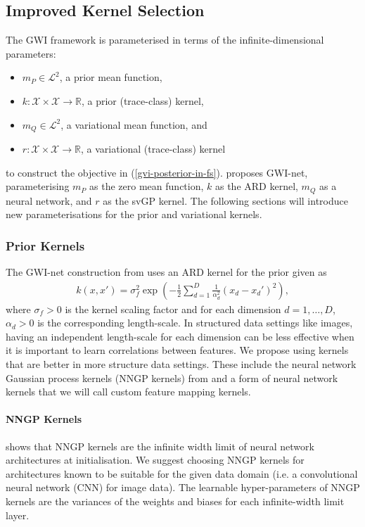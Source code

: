 \documentclass{article}
\numberwithin{equation}{section}
\begin{document}
\subsection{Improved Kernel Selection}
The GWI framework is parameterised in terms of the infinite-dimensional parameters:
\begin{itemize}
    \setlength\itemsep{-0.25em}
    \item $m_P \in \mathcal{L}^2$, a prior mean function,
    \item $k: \mathcal{X} \times \mathcal{X} \rightarrow \mathbb{R}$, a prior (trace-class) kernel,
    \item $m_Q \in \mathcal{L}^2$, a variational mean function, and
    \item $r: \mathcal{X} \times \mathcal{X} \rightarrow \mathbb{R}$, a variational (trace-class) kernel
\end{itemize}
to construct the objective in (\ref{gvi-posterior-in-fs}). \cite{wild2022generalized} proposes GWI-net, parameterising $m_P$ as the zero mean function, $k$ as the ARD kernel, $m_Q$ as a neural network, and $r$ as the svGP kernel.
The following sections will introduce new parameterisations for the prior and variational kernels.

\subsubsection{Prior Kernels}\label{prior-kernels}
The GWI-net construction from \cite{wild2022generalized} uses an ARD kernel for the prior given as
\begin{align}
    k(x, x') = \sigma^2_f \exp\left(-\frac{1}{2} \sum_{d=1}^D \frac{1}{\alpha_d^2}(x_d-x_d')^2\right),
\end{align}
where $\sigma_f > 0$ is the kernel scaling factor and for each dimension $d=1, \dots, D$, $\alpha_d >0$ is the corresponding length-scale.
In structured data settings like images, having an independent length-scale for each dimension can be less effective when it is important to learn correlations between features.
We propose using kernels that are better in more structure data settings. These include the neural network Gaussian process kernels (NNGP kernels) from \cite{novak2019neural} and a form of neural network kernels that we will call custom feature mapping kernels.

\paragraph{NNGP Kernels} \cite{novak2019neural} shows that NNGP kernels are the infinite width limit of neural network architectures at initialisation.
We suggest choosing NNGP kernels for architectures known to be suitable for the given data domain (i.e. a convolutional neural network (CNN) for image data).
The learnable hyper-parameters of NNGP kernels are the variances of the weights and biases for each infinite-width limit layer.
\end{document}
